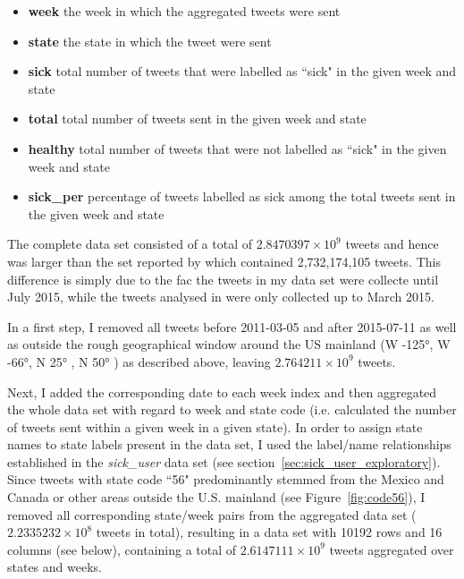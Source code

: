 \documentclass[11pt, a4paper]{report}\usepackage[]{graphicx}\usepackage[]{color}
\begin{document}
\begin{itemize}
  \item \textbf{week} the week in which the aggregated tweets were sent
  \item \textbf{state} the state in which the tweet were sent
  \item \textbf{sick} total number of tweets that were labelled as ``sick" in the given week and state
  \item \textbf{total} total number of tweets sent in the given week and state
  \item \textbf{healthy} total number of tweets that were not labelled as ``sick" in the given week and state
  \item \textbf{sick\_per} percentage of tweets labelled as sick among the total tweets sent in the given week and state
\end{itemize}


The complete data set consisted of a total of \ensuremath{2.8470397\times 10^{9}} tweets and hence was larger than the set reported by \citep{bodnar_data_2015} which contained 2,732,174,105 tweets. This difference is simply due to the fac the tweets in my data set were collecte until July 2015, while the tweets analysed in \citep{bodnar_data_2015} were only collected up to March 2015.\newline

In a first step, I removed all tweets before 2011-03-05 and after 2015-07-11 as well as outside the rough geographical window around the US mainland (W -125°, W -66°, N 25° , N 50° ) as described above, leaving \ensuremath{2.764211\times 10^{9}} tweets. \newline

Next, I added the corresponding date to each week index and then aggregated the whole data set with regard to week and state code (i.e. calculated the number of tweets sent within a given week in a given state). In order to assign state names to state labels present in the data set, I used the label/name relationships established in the \textit{sick\_user} data set (see section~\ref{sec:sick_user_exploratory}). Since tweets with state code ``56" predominantly stemmed from the Mexico and Canada or other areas outside the U.S. mainland (see Figure~\ref{fig:code56}), I removed all corresponding state/week pairs from the aggregated data set (\ensuremath{2.2335232\times 10^{8}} tweets in total), resulting in a data set with 10192 rows and 16 columns (see below), containing a total of \ensuremath{2.6147111\times 10^{9}} tweets aggregated over states and weeks.
\end{document}
